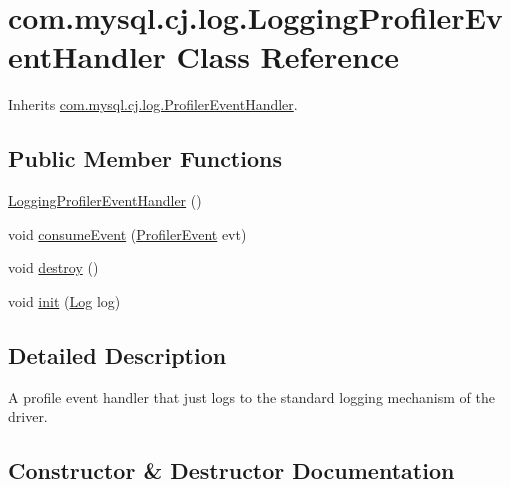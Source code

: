 \hypertarget{classcom_1_1mysql_1_1cj_1_1log_1_1_logging_profiler_event_handler}{}\section{com.\+mysql.\+cj.\+log.\+Logging\+Profiler\+Event\+Handler Class Reference}
\label{classcom_1_1mysql_1_1cj_1_1log_1_1_logging_profiler_event_handler}


Inherits \mbox{\hyperlink{interfacecom_1_1mysql_1_1cj_1_1log_1_1_profiler_event_handler}{com.\+mysql.\+cj.\+log.\+Profiler\+Event\+Handler}}.

\subsection*{Public Member Functions}
\begin{DoxyCompactItemize}
\item 
\mbox{\hyperlink{classcom_1_1mysql_1_1cj_1_1log_1_1_logging_profiler_event_handler_a9c95a2c58406570ef13ea85df1f58a92}{Logging\+Profiler\+Event\+Handler}} ()
\item 
void \mbox{\hyperlink{classcom_1_1mysql_1_1cj_1_1log_1_1_logging_profiler_event_handler_a62d6f1a7cdda2e47de6200d255eb5f10}{consume\+Event}} (\mbox{\hyperlink{interfacecom_1_1mysql_1_1cj_1_1log_1_1_profiler_event}{Profiler\+Event}} evt)
\item 
void \mbox{\hyperlink{classcom_1_1mysql_1_1cj_1_1log_1_1_logging_profiler_event_handler_aa1f3a232cf25ed493e6b399ba06a981c}{destroy}} ()
\item 
void \mbox{\hyperlink{classcom_1_1mysql_1_1cj_1_1log_1_1_logging_profiler_event_handler_a3940fb93810bc25e656b2080b7346b84}{init}} (\mbox{\hyperlink{interfacecom_1_1mysql_1_1cj_1_1log_1_1_log}{Log}} log)
\end{DoxyCompactItemize}


\subsection{Detailed Description}
A profile event handler that just logs to the standard logging mechanism of the driver. 

\subsection{Constructor \& Destructor Documentation}
\mbox{\label{classcom_1_1mysql_1_1cj_1_1log_1_1_logging_profiler_event_handler_a9c95a2c58406570ef13ea85df1f58a92}} 
